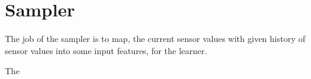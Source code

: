 \section{Sampler}

The job of the sampler is to map, the current sensor values with given history of sensor values into some input features, for the learner.

The 
